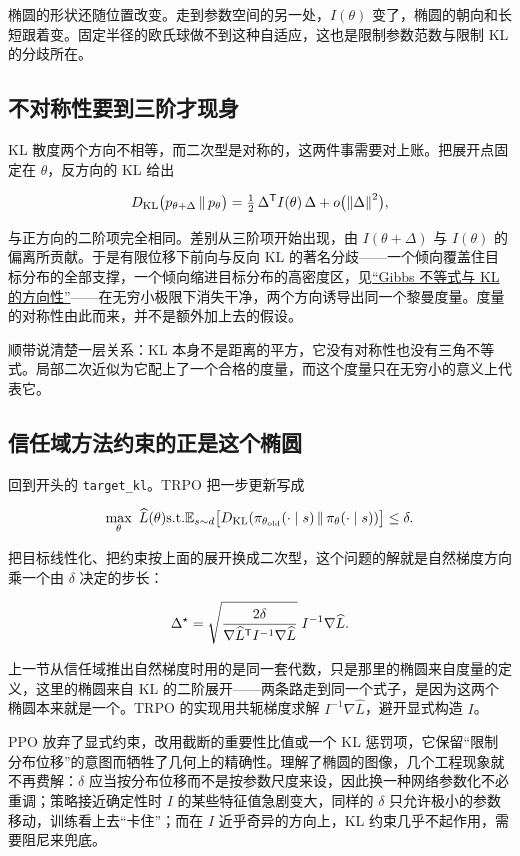 椭圆的形状还随位置改变。走到参数空间的另一处，\(I(\theta)\) 变了，椭圆的朝向和长短跟着变。固定半径的欧氏球做不到这种自适应，这也是限制参数范数与限制 KL 的分歧所在。

\subsection{不对称性要到三阶才现身}

KL 散度两个方向不相等，而二次型是对称的，这两件事需要对上账。把展开点固定在 \(\theta\)，反方向的 KL 给出

\[
D_{\mathrm{KL}}\bigl(p_{\theta+\Delta}\,\|\,p_\theta\bigr)
=\tfrac12\,\Delta^{\mathsf{T}}I(\theta)\,\Delta+o\bigl(\left\lVert\Delta\right\rVert^2\bigr),
\]

与正方向的二阶项完全相同。差别从三阶项开始出现，由 \(I(\theta+\Delta)\) 与 \(I(\theta)\) 的偏离所贡献。于是有限位移下前向与反向 KL 的著名分歧——一个倾向覆盖住目标分布的全部支撑，一个倾向缩进目标分布的高密度区，见\hyperref[sec:07-Information-Theory/03-Divergences/02]{``Gibbs 不等式与 KL 的方向性''}——在无穷小极限下消失干净，两个方向诱导出同一个黎曼度量。度量的对称性由此而来，并不是额外加上去的假设。

顺带说清楚一层关系：KL 本身不是距离的平方，它没有对称性也没有三角不等式。局部二次近似为它配上了一个合格的度量，而这个度量只在无穷小的意义上代表它。

\subsection{信任域方法约束的正是这个椭圆}

回到开头的 \texttt{target\_kl}。TRPO 把一步更新写成

\[
\max_{\theta}\ \widehat L(\theta)
\space\text{s.t.}\space
\mathbb{E}_{s\sim d}\bigl[D_{\mathrm{KL}}(\pi_{\theta_{\rm old}}(\cdot\mid s)\,\|\,\pi_\theta(\cdot\mid s))\bigr]\le\delta .
\]

把目标线性化、把约束按上面的展开换成二次型，这个问题的解就是自然梯度方向乘一个由 \(\delta\) 决定的步长：

\[
\Delta^{\star}=\sqrt{\frac{2\delta}{\nabla \widehat L^{\mathsf{T}}I^{-1}\nabla \widehat L}}\;I^{-1}\nabla \widehat L .
\]

上一节从信任域推出自然梯度时用的是同一套代数，只是那里的椭圆来自度量的定义，这里的椭圆来自 KL 的二阶展开——两条路走到同一个式子，是因为这两个椭圆本来就是一个。TRPO 的实现用共轭梯度求解 \(I^{-1}\nabla\widehat L\)，避开显式构造 \(I\)。

PPO 放弃了显式约束，改用截断的重要性比值或一个 KL 惩罚项，它保留``限制分布位移''的意图而牺牲了几何上的精确性。理解了椭圆的图像，几个工程现象就不再费解：\(\delta\) 应当按分布位移而不是按参数尺度来设，因此换一种网络参数化不必重调；策略接近确定性时 \(I\) 的某些特征值急剧变大，同样的 \(\delta\) 只允许极小的参数移动，训练看上去``卡住''；而在 \(I\) 近乎奇异的方向上，KL 约束几乎不起作用，需要阻尼来兜底。

